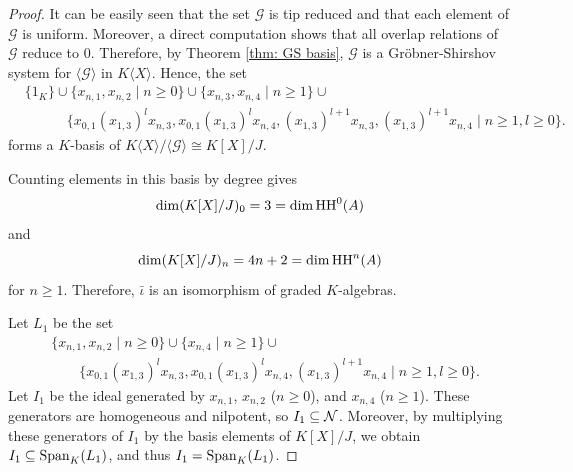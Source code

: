 \documentclass[10pt, reqno]{amsart}
\theoremstyle{definition}
\theoremstyle{remark}
\numberwithin{equation}{section}
\begin{document}
\begin{proof}
It can be easily seen that the set \(\mathscr{G}\) is tip reduced and that each element of \(\mathscr{G}\) is uniform.
Moreover, a direct computation shows that all overlap relations of \(\mathscr{G}\) reduce to \(0\).
Therefore, by Theorem \ref{thm: GS basis}, \(\mathscr{G}\) is a Gr\"obner-Shirshov system for \(\langle\mathscr{G}\rangle\) in \(K\langle X\rangle\). Hence, the set
\[\begin{aligned}
    &\{1_K\}\cup \{x_{n,1}, x_{n,2}\mid n \ge 0\}\cup \{x_{n,3}, x_{n,4}\mid n \ge 1\}\cup\\
&\quad\quad\quad\{x_{0,1}(x_{1,3})^l x_{n,3}, x_{0,1}(x_{1,3})^l x_{n,4}, (x_{1,3})^{l+1} x_{n,3},  (x_{1,3})^{l+1} x_{n,4} \mid n \ge 1, l \ge 0\}.
\end{aligned}
\]
forms a $K$-basis of \(K\langle X \rangle/\langle\mathscr{G} \rangle \cong K[X]/J \). 

Counting elements in this basis by degree gives
\[
\dim (K[X]/J)_0 = 3 = \dim \mathrm{HH}^0(A)
\]
and 
\[
\dim (K[X]/J)_n = 4n+2 = \dim \mathrm{HH}^n(A)
\]
for $n \ge 1$. Therefore, \(\bar{\iota} \) is an isomorphism of graded \(K\)-algebras.

Let $L_1$ be the set
\[\begin{aligned}
    &\{x_{n,1},  x_{n,2}\mid n \ge 0\}\cup \{  x_{n,4}\mid n \ge 1\} \cup\\
&\quad\quad\{x_{0,1}(x_{1,3})^l x_{n,3},  x_{0,1}(x_{1,3})^l x_{n,4},  (x_{1,3})^{l+1} x_{n,4} \mid n \ge 1,  l \ge 0\}.
\end{aligned}
\] 
Let $I_1$ be the ideal generated by $x_{n,1}$, $x_{n,2}$ ($n\ge0$), and $x_{n,4}$ ($n\ge1$). These generators are homogeneous and nilpotent, so
$I_1\subseteq\mathcal{N}$. Moreover, by multiplying these generators of $I_1$ by the basis elements of $K[X]/J$, we obtain $I_1\subseteq \mathrm{Span}_K(L_1)$, and thus $I_1= \mathrm{Span}_K(L_1)$. 


\end{proof}
\end{document}
